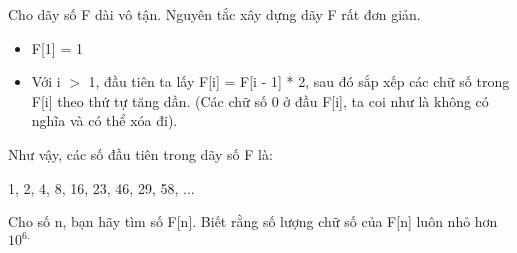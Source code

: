 Cho dãy số F dài vô tận. Nguyên tắc xây dựng dãy F rất đơn giản.  
\begin{itemize}
	\item     F[1] = 1   
	\item     Với i $>$ 1, đầu tiên ta lấy F[i] = F[i - 1] * 2, sau đó sắp xếp các chữ số trong F[i] theo thứ tự tăng dần. (Các chữ số 0 ở đầu F[i], ta coi như là không có nghĩa và có thể xóa đi).   
\end{itemize}

   Như vậy, các số đầu tiên trong dãy số F là:  

   1, 2, 4, 8, 16, 23, 46, 29, 58, ...  

   Cho số n, bạn hãy tìm số F[n]. Biết rằng số lượng chữ số của F[n] luôn nhỏ hơn $10^{6.}$